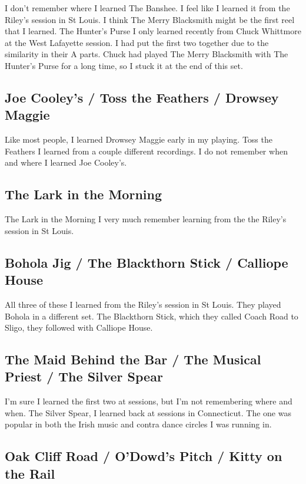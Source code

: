 \documentclass[11pt,letterpaper]{article}
\begin{document}
I don't remember where I learned The Banshee. I feel like I learned it from the Riley's session in St Louis. I think The Merry Blacksmith might be the first reel that I learned. The Hunter's Purse I only learned recently from Chuck Whittmore at the West Lafayette session. I had put the first two together due to the similarity in their A parts. Chuck had played The Merry Blacksmith with The Hunter's Purse for a long time, so I stuck it at the end of this set.

\subsection{Joe Cooley's / Toss the Feathers / Drowsey Maggie}

Like most people, I learned Drowsey Maggie early in my playing. Toss the Feathers I learned from a couple different recordings. I do not remember when and where I learned Joe Cooley's. 

\subsection{The Lark in the Morning}

The Lark in the Morning I very much remember learning from the the Riley's session in St Louis.

\subsection{Bohola Jig / The Blackthorn Stick / Calliope House}

All three of these I learned from the Riley's session in St Louis. They played Bohola in a different set. The Blackthorn Stick, which they called Coach Road to Sligo, they followed with Calliope House.

\subsection{The Maid Behind the Bar / The Musical Priest / The Silver Spear}

I'm sure I learned the first two at sessions, but I'm not remembering where and when. The Silver Spear, I learned back at sessions in Connecticut. The one was popular in both the Irish music and contra dance circles I was running in. 

\subsection{Oak Cliff Road / O'Dowd's Pitch / Kitty on the Rail}
\end{document}
